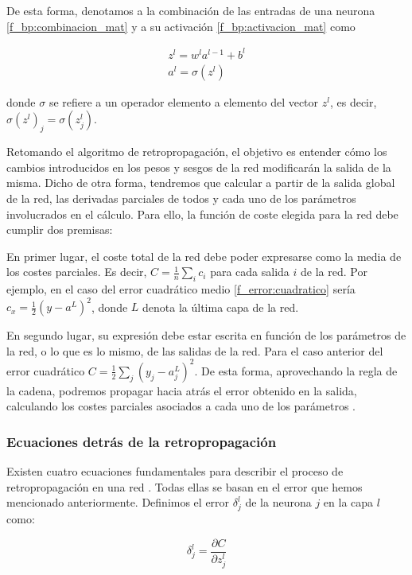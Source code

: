 \begin{appendices}
De esta forma, denotamos a la combinación de las entradas de una neurona \ref{f_bp:combinacion_mat} y a su activación \ref{f_bp:activacion_mat} como

\begin{align}
	z^l = w^l a^{l-1} + b^l \label{f_bp:combinacion_mat}\\
	a^l = \sigma(z^l) \label{f_bp:activacion_mat}
\end{align}

donde $\sigma$ se refiere a un operador elemento a elemento del vector $z^l$, es decir, $\sigma(z^l)_j = \sigma(z_j^l)$.

Retomando el algoritmo de retropropagación, el objetivo es entender cómo los cambios introducidos en los pesos y sesgos de la red modificarán la salida de la misma. Dicho de otra forma, tendremos que calcular a partir de la salida global de la red, las derivadas parciales de todos y cada uno de los parámetros involucrados en el cálculo. Para ello, la función de coste elegida para la red debe cumplir dos premisas:

En primer lugar, el coste total de la red debe poder expresarse como la media de los costes parciales. Es decir, $C = \frac{1}{n}\sum_i c_i$ para cada salida $i$ de la red. Por ejemplo, en el caso del error cuadrático medio \eqref{f_error:cuadratico} sería $c_x = \frac{1}{2}(y-a^L)^2$, donde $L$ denota la última capa de la red.

En segundo lugar, su expresión debe estar escrita en función de los parámetros de la red, o lo que es lo mismo, de las salidas de la red. Para el caso anterior del error cuadrático $C = \frac{1}{2}\sum_j(y_j-a_j^L)^2$. De esta forma, aprovechando la regla de la cadena, podremos propagar hacia atrás el error obtenido en la salida, calculando los costes parciales asociados a cada uno de los parámetros \cite{nn_dl__michael_nielsen_2015}.

\subsubsection{Ecuaciones detrás de la retropropagación}

Existen cuatro ecuaciones fundamentales para describir el proceso de retropropagación en una red \cite{nn_dl__michael_nielsen_2015}. Todas ellas se basan en el error que hemos mencionado anteriormente. Definimos el error $\delta_j^l$ de la neurona $j$ en la capa $l$ como:

\begin{equation}\label{f_bp:error}
	\delta_j^l = \frac{\partial C}{\partial z_j^l}
\end{equation}


\end{appendices}
